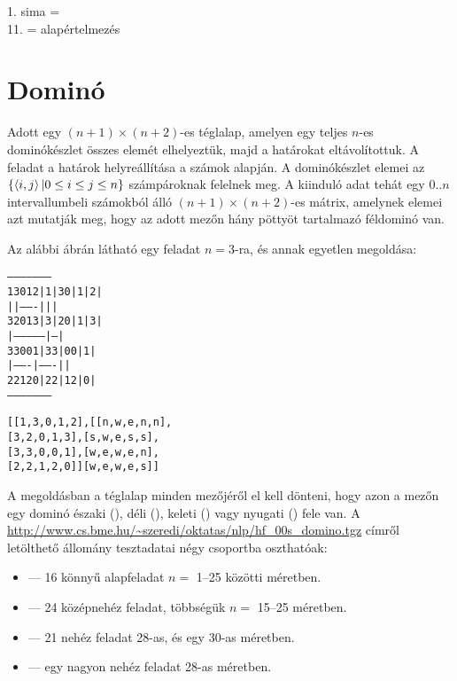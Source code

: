 1. sima = \\
11. = alapértelmezés



\section{Dominó}

Adott egy $(n+1)\times(n+2)$-es téglalap, amelyen egy teljes $n$-es dominókészlet
összes elemét elhelyeztük, majd a határokat eltávolítottuk. A feladat a határok
helyreállítása a számok alapján. A dominókészlet elemei az
$\{\left\langle i,j\right\rangle | 0 \leq i  \leq j \leq n \}$ számpároknak felelnek meg. A kiinduló
adat tehát egy $0..n$ intervallumbeli számokból álló $(n+1)\times(n+2)$-es mátrix,
amelynek elemei azt mutatják meg, hogy az adott mezőn hány pöttyöt tartalmazó féldominó
van.

Az alábbi ábrán látható egy feladat $n=3$-ra, és annak egyetlen megoldása:

\begin{alltt}
                                  ---------------------
     1   3   0   1   2            | 1 | 3   0 | 1 | 2 |
                                  |   |-------|   |   |
     3   2   0   1   3            | 3 | 2   0 | 1 | 3 |
                                  |---------------|---|
     3   3   0   0   1            | 3   3 | 0   0 | 1 |
                                  |-------|-------|   |
     2   2   1   2   0            | 2   2 | 1   2 | 0 |
                                  ---------------------

   % Bemenő adatformátum:         % A megoldás Prolog alakja:

   [[1,  3,  0,  1,  2],          [[n,  w,  e,  n,  n],
    [3,  2,  0,  1,  3],           [s,  w,  e,  s,  s],
    [3,  3,  0,  0,  1],           [w,  e,  w,  e,  n],
    [2,  2,  1,  2,  0]]           [w,  e,  w,  e,  s]]

\end{alltt}

A megoldásban a téglalap minden mezőjéről el kell dönteni, hogy azon a mezőn egy dominó
északi (), déli (), keleti () vagy nyugati () fele van. A \url{http://www.cs.bme.hu/~szeredi/oktatas/nlp/hf_00s_domino.tgz} címről letölthető állomány
tesztadatai négy csoportba oszthatóak:

\begin{itemize}
\item {} --- 16 könnyű alapfeladat $n = $ 1--25 közötti méretben.
\item {} --- 24 középnehéz feladat, többségük $n = $ 15--25 méretben.
\item {} --- 21 nehéz feladat 28-as, és egy 30-as méretben.
\item {} --- egy nagyon nehéz feladat 28-as méretben.
\end{itemize}

